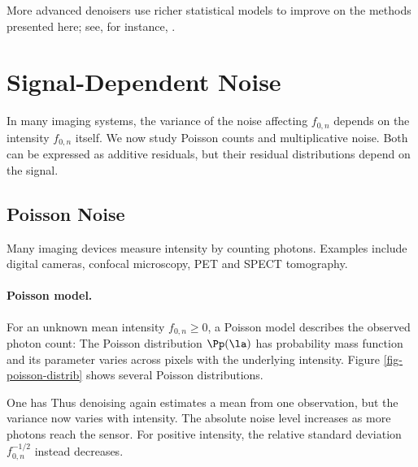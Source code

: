 More advanced denoisers use richer statistical models to improve on the methods presented here; see, for instance, \cite{portilla-denoise}.




\section{Signal-Dependent Noise}
\label{sect-data-dept-noises}

In many imaging systems, the variance of the noise affecting $f_{0,n}$ depends on the intensity $f_{0,n}$ itself. We now study Poisson counts and multiplicative noise. Both can be expressed as additive residuals, but their residual distributions depend on the signal.

\subsection{Poisson Noise}

Many imaging devices measure intensity by counting photons. Examples include digital cameras, confocal microscopy, PET and SPECT tomography.

\paragraph{Poisson model.}

For an unknown mean intensity $f_{0,n}\geq0$, a Poisson model describes the observed photon count:
\eq{
	f_n \sim \Pp(\la)
	\qwhereq \lambda=f_{0,n}\in[0,\infty),
}
The Poisson distribution $\Pp(\la)$ has probability mass function
and its parameter varies across pixels with the underlying intensity. Figure \ref{fig-poisson-distrib} shows several Poisson distributions.


One has 
Thus denoising again estimates a mean from one observation, but the variance now varies with intensity. The absolute noise level increases as more photons reach the sensor. For positive intensity, the relative standard deviation $f_{0,n}^{-1/2}$ instead decreases.

